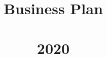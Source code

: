 \documentclass[10pt,twoside]{article}
\begin{document}
\def\graphicTitlepage{}
\ifx\graphicTitlepage\undefined
	\title{\companyFullName{}
	\\Business Plan\\\large{\version{}}\\\textsubscript{\textcopyright}2020}
	\author{\yourName}
	\maketitle
\else 
	 
\fi

\newpage
\tableofcontents








%
\begin{appendix}
	\listoffigures
	\listoftables
\end{appendix}
\end{document}
